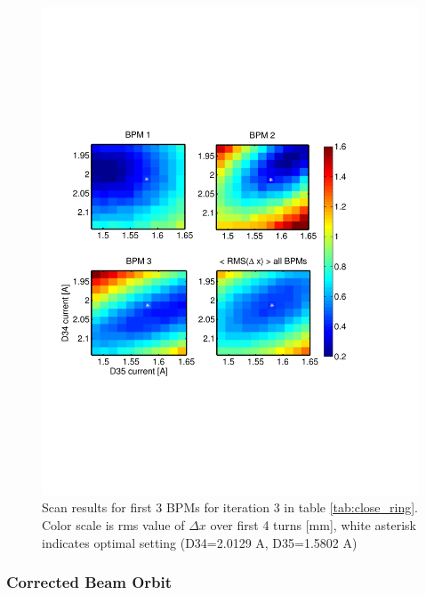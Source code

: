 \begin{figure}[htb]
\centering
\includegraphics[width=\textwidth,trim={0 2.7in 1in 2.7in},clip]{4.figures/closing_orbit_iteration3.pdf}
\caption{Scan results for first 3 BPMs for iteration 3 in table \ref{tab:close_ring}. Color scale is rms value of $\Delta x$ over first 4 turns [mm], white asterisk indicates optimal setting (D34=2.0129 A, D35=1.5802 A) }
\label{fig:close_scan}
\end{figure}


\subsubsection{Corrected Beam Orbit}


